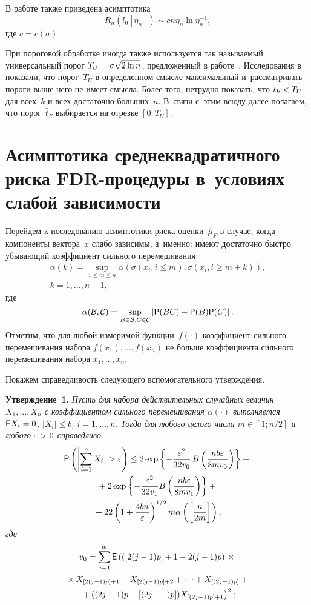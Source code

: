 \begin{multicols}{2}
В работе также приведена асимптотика
$$
R_n(l_0[\eta_n])\sim c n\eta_n \ln \eta_n^{-1},
$$
где $c=c(\sigma)$.

При пороговой обработке иногда также используется так называемый универсальный 
порог $T_U \hm= \sigma \sqrt{2\ln n}$, предложенный в работе~\cite{spatialAdaptation}. Исследования в~\cite{AdaptingSURE, ExactRisk} 
показали, что порог~$T_U$ в определенном смысле максимальный и~рассматривать 
пороги выше него не имеет смысла. Более того, нетрудно показать, что $t_k\hm < T_U$ 
для всех~$k$ и всех достаточно больших~$n$.  В~связи с~этим всюду далее 
полагаем, что порог~$\hat{t}_F$ выбирается на отрезке $[0; T_U]$.

\section{Асимптотика среднеквадратичного риска FDR-процедуры в~условиях слабой 
зависимости}

Перейдем к исследованию асимптотики риска оценки~$\hat{\mu}_F$ в случае, когда 
компоненты вектора~$x$ слабо зависимы, а~именно: имеют достаточно быст\-ро 
убывающий коэффициент сильного перемешивания~\cite{Bosq}
\begin{multline*}
\alpha(k) = \sup\limits_{1\leq m\leq n}\alpha\left(\sigma(x_i, i\leq m), 
\sigma(x_i, i\geq m+k)\right), \\ k=1,\ldots,n-1,
\end{multline*}
где
$$
\alpha(\mathcal{B},\mathcal{C}) = \sup\limits_{B\in\mathcal{B}, 
C\in\mathcal{C}} \left|{\sf P}(BC)-{\sf P}(B){\sf P}(C)\right|.
$$
Отметим, что для любой измеримой функции~$f(\cdot)$ коэффициент сильного 
перемешивания набора $f(x_1),\ldots,f(x_n)$ не больше коэффициента сильного 
перемешивания набора $x_1,\ldots,x_n$.



Покажем справедливость следующего вспомогательного утверж\-де\-ния.

\smallskip

\noindent
\textbf{Утверждение~1.}
\textit{Пусть для набора действительных случайных величин $X_1,\dots,X_n$ с 
коэффициентом сильного перемешивания $\alpha(\cdot)$ выполняется $\e X_i \hm= 0$, 
$|X_i| \leq b$, $i = 1,\dots,n$. Тогда для любого целого числа $m\in[1;n/2]$ и 
любого $\varepsilon > 0$ справедливо}
\begin{multline}
{\sf P}\left(\left|\sum\limits_{i=1}^n X_i\right| > \varepsilon\right) \leq 2 \exp\left\{-
\displaystyle\frac{\displaystyle \varepsilon^2\mathstrut}{\displaystyle 32 v_0\mathstrut}\, B\left(\displaystyle\frac{\displaystyle nb\varepsilon\mathstrut}{\displaystyle 8m v_0\mathstrut}\right)\right\}+{}\\
{}+ 2 \exp\left\{-\displaystyle\frac{\displaystyle \varepsilon^2\mathstrut}{\displaystyle 32 v_1\mathstrut} B\left(\displaystyle\frac{\displaystyle nb\varepsilon\mathstrut}{\displaystyle 8m  v_1\mathstrut}\right)\right\} +{}\\
{}+ 22\left(1+\displaystyle\frac{\displaystyle 4bn\mathstrut}{\displaystyle \varepsilon\mathstrut}\right)^{1/2} m \alpha\left(\left[\displaystyle\frac{\displaystyle n\mathstrut}{\displaystyle 2m\mathstrut}\right]\right), 
\label{statement1}
\end{multline}
\textit{где}
\begin{multline*}
v_0 = \sum\limits_{j=1}^m {\sf E}\left(([2(j-1)p]+1-2(j-1)p)\right. \times{}\\
{}\times X_{[2(j-1)p]+1}+X_{[2(j-1)p]+2}+\cdots + X_{[(2j-1)p]} +{}\\
\left.{}+ ((2j-1)p-[(2j-1)p])X_{[(2j-1)p]+1}\right)^2 ;
\end{multline*}


\end{multicols}
